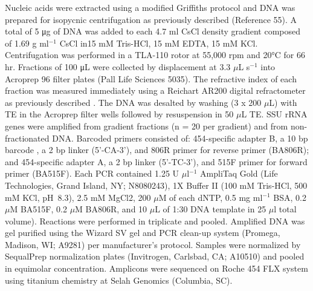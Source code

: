 Nucleic acids were extracted using a modified Griffiths protocol \cite{Griffiths_2000}
and DNA was prepared for isopycnic centrifugation as previously described
(Reference 55). A total of 5 μg of DNA was added to each 4.7 ml CsCl density
gradient composed of 1.69 g ml$^{-1}$ CsCl in15 mM Tris-HCl, 15 mM EDTA, 15 mM KCl.
Centrifugation was performed in a TLA-110 rotor at 55,000 rpm and 20°C for 66
hr. Fractions of 100 μL were collected by displacement at 3.3 $\mu$L s$^{-1}$
\cite{Manefield_2002} into Acroprep 96 filter plates (Pall Life Sciences 5035).
The refractive index of each fraction was measured immediately using a Reichart
AR200 digital refractometer as previously described
\cite{Buckley_2007}. The DNA was desalted by washing (3 x 200
$\mu$L) with TE in the Acroprep filter wells followed by resuspension in 50
$\mu$L TE. SSU rRNA genes were amplified from gradient fractions (n = 20 per
gradient) and from non-fractionated DNA. Barcoded primers consisted of:
454-specific adapter B, a 10 bp barcode \citep{Hamady_2008},
a 2 bp linker (5’-CA-3’), and 806R primer for reverse primer (BA806R); and
454-specific adapter A, a 2 bp linker (5’-TC-3’), and 515F primer for forward
primer (BA515F). Each PCR contained 1.25 U $\mu$l$^{-1}$ AmpliTaq Gold (Life
Technologies, Grand Island, NY; N8080243), 1X Buffer II (100 mM Tris-HCl, 500
mM KCl, pH~8.3), 2.5 mM MgCl2, 200 $\mu$M of each dNTP, 0.5 mg ml$^{-1}$ BSA,
0.2 $\mu$M BA515F, 0.2 $\mu$M BA806R, and 10 $\mu$L of 1:30 DNA template in 25
$\mu$l total volume). Reactions were performed in triplicate and pooled.
Amplified DNA was gel purified using the Wizard SV gel and PCR clean-up
system (Promega, Madison, WI; A9281) per manufacturer’s protocol. Samples
were normalized by SequalPrep normalization plates (Invitrogen, Carlsbad, CA;
A10510) and pooled in equimolar concentration. Amplicons were sequenced on
Roche 454 FLX system using titanium chemistry at Selah Genomics (Columbia,
SC). 

